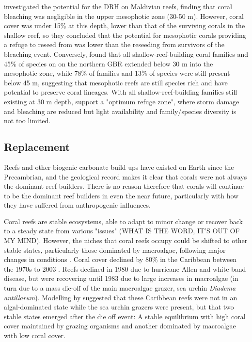 \documentclass[11pt,a4paper]{article}
\begin{document}
\cite{Montefalcone2020} investigated the potential for the DRH on Maldivian reefs, finding that coral bleaching was negligible in the upper mesophotic zone (30-50 m).
 However, coral cover was under 15\% at this depth, lower than that of the surviving corals in the shallow reef, so they concluded that the potential for mesophotic corals providing a refuge to reseed from was lower than the reseeding from survivors of the bleaching event.
 Conversely, \cite{Muir2018} found that all shallow-reef-building coral families and 45\% of species on on the northern GBR extended below 30 m into the mesophotic zone, while 78\% of families and 13\% of species were still present below 45 m, suggesting that mesophotic reefs are still species rich and have potential to preserve coral lineages.
 With all shallow-reef-building families still existing at 30 m depth, \cite{Muir2018} support a "optimum refuge zone", where storm damage and bleaching are reduced but light availability and family/species diversity is not too limited.


\subsection{Replacement}

Reefs and other biogenic carbonate build ups have existed on Earth since the Precambrian, and the geological record makes it clear that corals were not always the dominant reef builders.
 There is no reason therefore that corals will continue to be the dominant reef builders in even the near future, particularly with how they have suffered from anthropogenic influences.

Coral reefs are stable ecosystems, able to adapt to minor change or recover back to a steady state from various "issues" (WHAT IS THE WORD, IT'S OUT OF MY MIND).
 However, the niches that coral reefs occupy could be shifted to other stable states, particularly those dominated by macroalgae, following major changes in conditions \cite{Knowlton1992}.
 Coral cover declined by 80\% in the Caribbean between the 1970s to 2003 \citep{Gardner2003}.
 Reefs declined  in 1980 due to hurricane Allen and white band disease, but were recovering until 1983 due to large increases in macroalgae (in turn due to a mass die-off of the main macroalgae grazer, sea urchin \textit{Diadema antillarum}).
 Modelling by \cite{Mumby2007} suggested that these Caribbean reefs were not in an algal-dominated state while the sea urchin grazers were present, but that two stable states emerged after the die off event: A stable equilibrium with high coral cover maintained by grazing organisms and another dominated by macroalgae with low coral cover. 
\end{document}
